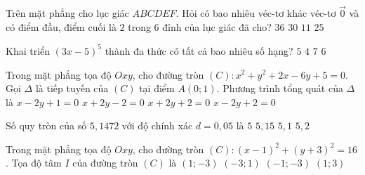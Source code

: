 \begin{ex}%
	Trên mặt phẳng cho lục giác $ABCDEF$. Hỏi có bao nhiêu véc-tơ khác véc-tơ $\overrightarrow{0}$ và có điểm đầu, điểm cuối là $2$ trong $6$ đỉnh của lục giác đã cho?
	\choice
	{$36$}
	{\True $30$}
	{$11$}
	{$25$}
\end{ex}
\begin{ex}%
	Khai triển $(3x-5)^5$ thành đa thức có tất cả bao nhiêu số hạng?
	\choice
	{$5$}
	{$4$}
	{$7$}
	{\True $6$}
\end{ex}
\begin{ex}%
	Trong mặt phẳng tọa độ $Oxy$, cho đường tròn $(C)\colon x^2+y^2+2x-6y+5=0$. Gọi $\Delta$ là tiếp tuyến của $(C)$ tại điểm $A(0;1)$. Phương trình tổng quát của $\Delta$ là
	\choice
	{$x-2y+1=0$}
	{$x+2y-2=0$}
	{$x+2y+2=0$}
	{\True $x-2y+2=0$}
\end{ex}
\begin{ex}%
	Số quy tròn của số $5{,}1472$ với độ chính xác $d=0{,}05$ là
	\choice
	{$5$}
	{$5{,}15$}
	{\True $5{,}1$}
	{$5{,}2$}
\end{ex}
\begin{ex}%
	Trong mặt phẳng tọa độ $Oxy$, cho đường tròn $(C)\colon (x-1)^2+(y+3)^2=16$. Tọa độ tâm $I$ của đường tròn $(C)$ là
	\choice
	{\True $(1;-3)$}
	{$(-3;1)$}
	{$(-1;-3)$}
	{$(1;3)$}
\end{ex}
